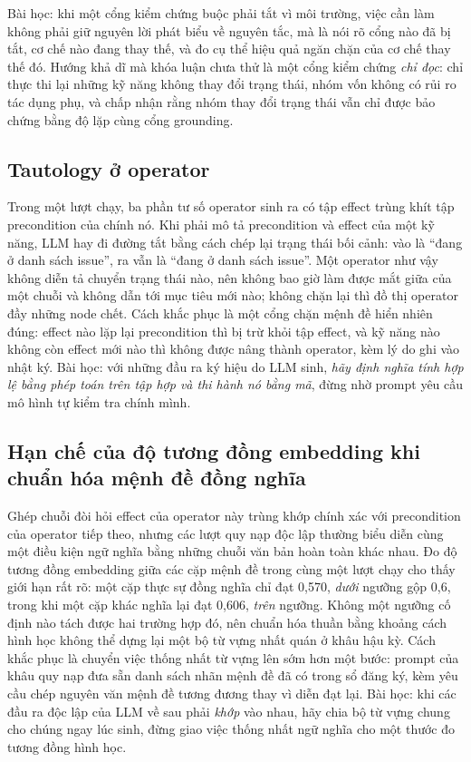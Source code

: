 Bài học: khi một cổng kiểm chứng buộc phải tắt vì môi trường, việc cần làm
không phải giữ nguyên lời phát biểu về nguyên tắc, mà là nói rõ cổng nào đã bị
tắt, cơ chế nào đang thay thế, và đo cụ thể hiệu quả ngăn chặn của cơ chế thay
thế đó. Hướng khả dĩ mà khóa luận chưa thử là một cổng kiểm chứng \emph{chỉ
đọc}: chỉ thực thi lại những kỹ năng không thay đổi trạng thái, nhóm vốn không
có rủi ro tác dụng phụ, và chấp nhận rằng nhóm thay đổi trạng thái vẫn chỉ được
bảo chứng bằng độ lặp cùng cổng grounding.

\subsection{Tautology ở operator}

Trong một lượt chạy, ba phần tư số operator sinh ra có tập effect trùng khít
tập precondition của chính nó. Khi phải mô tả precondition và effect của một kỹ
năng, LLM hay đi đường tắt bằng cách chép lại trạng thái bối cảnh: vào là
``đang ở danh sách issue'', ra vẫn là ``đang ở danh sách issue''. Một operator
như vậy không diễn tả chuyển trạng thái nào, nên không bao giờ làm được mắt
giữa của một chuỗi và không dẫn tới mục tiêu mới nào; không chặn lại thì đồ thị
operator đầy những node chết. Cách khắc phục là một cổng chặn mệnh đề hiển
nhiên đúng: effect nào lặp lại precondition thì bị trừ khỏi tập effect, và kỹ
năng nào không còn effect mới nào thì không được nâng thành operator, kèm lý do
ghi vào nhật ký. Bài học: với những đầu ra ký hiệu do LLM sinh, \emph{hãy định
nghĩa tính hợp lệ bằng phép toán trên tập hợp và thi hành nó bằng mã}, đừng nhờ
prompt yêu cầu mô hình tự kiểm tra chính mình.

\subsection{Hạn chế của độ tương đồng embedding khi chuẩn hóa mệnh đề đồng nghĩa}

Ghép chuỗi đòi hỏi effect của operator này trùng khớp chính xác với precondition
của operator tiếp theo, nhưng các lượt quy nạp độc lập thường biểu diễn cùng
một điều kiện ngữ nghĩa bằng những chuỗi văn bản hoàn toàn khác nhau. Đo độ
tương đồng embedding giữa các cặp mệnh đề trong cùng một lượt chạy cho thấy
giới hạn rất rõ: một cặp thực sự đồng nghĩa chỉ đạt 0{,}570, \emph{dưới} ngưỡng
gộp 0{,}6, trong khi một cặp khác nghĩa lại đạt 0{,}606, \emph{trên} ngưỡng.
Không một ngưỡng cố định nào tách được hai trường hợp đó, nên chuẩn hóa thuần
bằng khoảng cách hình học không thể dựng lại một bộ từ vựng nhất quán ở khâu
hậu kỳ. Cách khắc phục là chuyển việc thống nhất từ vựng lên sớm hơn một bước:
prompt của khâu quy nạp đưa sẵn danh sách nhãn mệnh đề đã có trong sổ đăng ký,
kèm yêu cầu chép nguyên văn mệnh đề tương đương thay vì diễn đạt lại. Bài học:
khi các đầu ra độc lập của LLM về sau phải \emph{khớp} vào nhau, hãy chia bộ từ
vựng chung cho chúng ngay lúc sinh, đừng giao việc thống nhất ngữ nghĩa cho một
thước đo tương đồng hình học.


